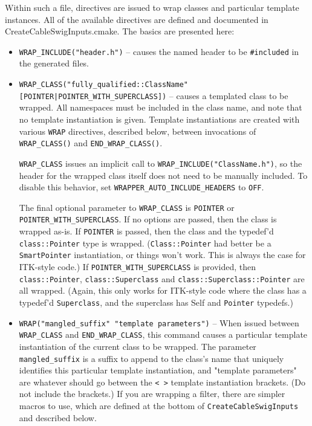 \documentclass{InsightArticle}
\begin{document}
Within such a file, directives are issued to wrap classes and particular
template instances. All of the available directives are defined and documented
in CreateCableSwigInputs.cmake. The basics are presented here:

\begin{itemize}
  \item \verb$WRAP_INCLUDE("header.h")$ -- causes the named header to be \verb$#included$ in the
generated files. 

  \item \verb$WRAP_CLASS("fully_qualified::ClassName" [POINTER|POINTER_WITH_SUPERCLASS])$ --
causes a templated class to be wrapped. All namespaces must be included in the
class name, and note that no template instantiation is given. Template
instantiations are created with various \verb$WRAP$ directives, described below,
between invocations of \verb$WRAP_CLASS()$ and \verb$END_WRAP_CLASS()$.

\verb$WRAP_CLASS$ issues an implicit call to \verb$WRAP_INCLUDE("ClassName.h")$, so the header
for the wrapped class itself does not need to be manually included. To disable
this behavior, set \verb$WRAPPER_AUTO_INCLUDE_HEADERS$ to \verb$OFF$.

The final optional parameter to \verb$WRAP_CLASS$ is \verb$POINTER$ or
\verb$POINTER_WITH_SUPERCLASS$. If no options are passed, then the class is wrapped
as-is. If \verb$POINTER$ is passed, then the class and the typedef'd \verb$class::Pointer$
type is wrapped. (\verb$Class::Pointer$ had better be a \verb$SmartPointer$ instantiation, or
things won't work. This is always the case for ITK-style code.) If
\verb$POINTER_WITH_SUPERCLASS$ is provided, then \verb$class::Pointer$, \verb$class::Superclass$ and
\verb$class::Superclass::Pointer$ are all wrapped. (Again, this only works for
ITK-style code where the class has a typedef'd \verb$Superclass$, and the superclass
has Self and \verb$Pointer$ typedefs.)

  \item \verb$WRAP("mangled_suffix" "template parameters")$ -- When issued between \verb$WRAP_CLASS$
and \verb$END_WRAP_CLASS$, this command causes a particular template instantiation of
the current class to be wrapped. The parameter \verb$mangled_suffix$ is a suffix to
append to the class's name that uniquely identifies this particular template
instantiation, and "template parameters" are whatever should go between the \verb$< >$
template instantiation brackets. (Do not include the brackets.) If you are
wrapping a filter, there are simpler macros to use, which are defined at the
bottom of \verb$CreateCableSwigInputs$ and described below.


\end{itemize}
\end{document}
